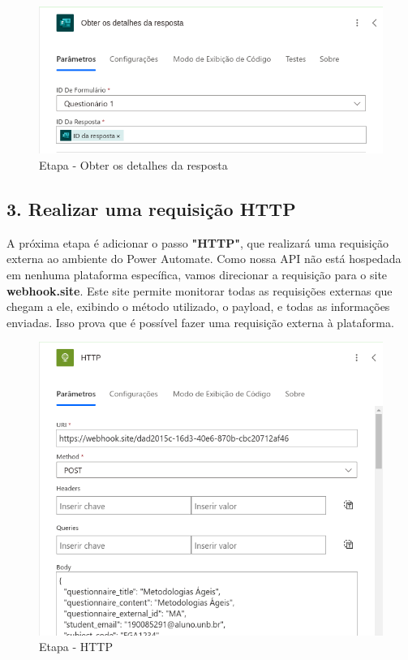 \begin{figure}[H]
    \centering
    \includegraphics[width=1\textwidth]{figuras/mpa_detail_answer.png}
    \caption{Etapa - Obter os detalhes da resposta}
    \label{fig:report_questions}
\end{figure}

\subsection*{3. Realizar uma requisição HTTP}

A próxima etapa é adicionar o passo \textbf{"HTTP"}, que realizará uma requisição externa ao ambiente do Power Automate.
Como nossa API não está hospedada em nenhuma plataforma específica, vamos direcionar a requisição para o site \textbf{webhook.site}.
Este site permite monitorar todas as requisições externas que chegam a ele, exibindo o método utilizado, o payload, e todas as informações enviadas. Isso prova que é possível fazer uma requisição externa à plataforma.

\begin{figure}[H]
    \centering
    \includegraphics[width=1\textwidth]{figuras/mpa_http.png}
    \caption{Etapa - HTTP}
    \label{fig:report_questions}
\end{figure}

